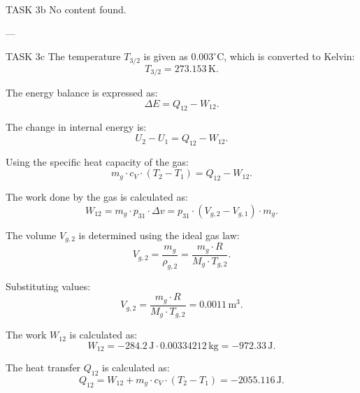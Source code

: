 TASK 3b  
No content found.

---

TASK 3c  
The temperature \( T_{3/2} \) is given as \( 0.003^\circ\text{C} \), which is converted to Kelvin:  
\[
T_{3/2} = 273.153 \, \text{K}.
\]

The energy balance is expressed as:  
\[
\Delta E = Q_{12} - W_{12}.
\]

The change in internal energy is:  
\[
U_2 - U_1 = Q_{12} - W_{12}.
\]

Using the specific heat capacity of the gas:  
\[
m_g \cdot c_V \cdot (T_2 - T_1) = Q_{12} - W_{12}.
\]

The work done by the gas is calculated as:  
\[
W_{12} = m_g \cdot p_{31} \cdot \Delta v = p_{31} \cdot (V_{g,2} - V_{g,1}) \cdot m_g.
\]

The volume \( V_{g,2} \) is determined using the ideal gas law:  
\[
V_{g,2} = \frac{m_g}{\rho_{g,2}} = \frac{m_g \cdot R}{M_g \cdot T_{g,2}}.
\]

Substituting values:  
\[
V_{g,2} = \frac{m_g \cdot R}{M_g \cdot T_{g,2}} = 0.0011 \, \text{m}^3.
\]

The work \( W_{12} \) is calculated as:  
\[
W_{12} = -284.2 \, \text{J} \cdot 0.00334212 \, \text{kg} = -972.33 \, \text{J}.
\]

The heat transfer \( Q_{12} \) is calculated as:  
\[
Q_{12} = W_{12} + m_g \cdot c_V \cdot (T_2 - T_1) = -2055.116 \, \text{J}.
\]